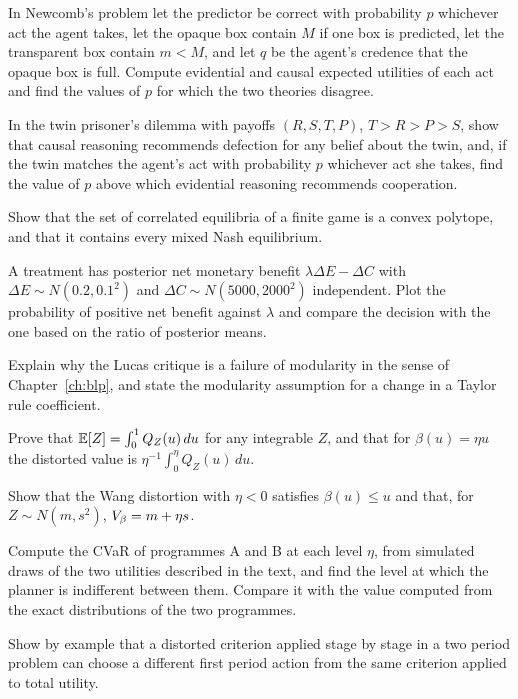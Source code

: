 \begin{exercises}
\item\label{ex:chcdt:1} In Newcomb's problem let the predictor be correct with probability $p$ whichever act the agent takes, let the opaque box contain $M$ if one box is predicted, let the transparent box contain $m<M$, and let $q$ be the agent's credence that the opaque box is full. Compute evidential and causal expected utilities of each act and find the values of $p$ for which the two theories disagree.
\item\label{ex:chcdt:2} In the twin prisoner's dilemma with payoffs $(R,S,T,P)$, $T>R>P>S$, show that causal reasoning recommends defection for any belief about the twin, and, if the twin matches the agent's act with probability $p$ whichever act she takes, find the value of $p$ above which evidential reasoning recommends cooperation.
\item\label{ex:chcdt:3} Show that the set of correlated equilibria of a finite game is a convex polytope, and that it contains every mixed Nash equilibrium.
\item\label{ex:chcdt:4} A treatment has posterior net monetary benefit $\lambda\Delta E - \Delta C$ with $\Delta E\sim N(0.2, 0.1^2)$ and $\Delta C\sim N(5000, 2000^2)$ independent. Plot the probability of positive net benefit against $\lambda$ and compare the decision with the one based on the ratio of posterior means.
\item\label{ex:chcdt:5} Explain why the Lucas critique is a failure of modularity in the sense of Chapter~\ref{ch:blp}, and state the modularity assumption for a change in a Taylor rule coefficient.

\item\label{ex:chgbc:1} Prove that $\mathbb{E}[Z] = \int_0^1 Q_Z(u)\,du$ for any integrable $Z$, and that for $\beta(u)=\eta u$ the distorted value is $\eta^{-1}\int_0^\eta Q_Z(u)\,du$.
\item\label{ex:chgbc:2} Show that the Wang distortion with $\eta<0$ satisfies $\beta(u)\le u$ and that, for $Z\sim N(m,s^2)$, $V_{\beta} = m + \eta s$.
\item\label{ex:chgbc:4} Compute the CVaR of programmes A and B at each level $\eta$, from simulated draws of the two utilities described in the text, and find the level at which the planner is indifferent between them. Compare it with the value computed from the exact distributions of the two programmes.
\item\label{ex:chgbc:5} Show by example that a distorted criterion applied stage by stage in a two period problem can choose a different first period action from the same criterion applied to total utility.
\end{exercises}

